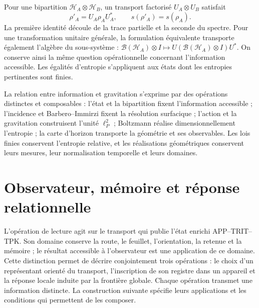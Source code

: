 Pour une bipartition \(\mathcal H_A\otimes\mathcal H_B\), un
transport factorisé \(U_A\otimes U_B\) satisfait
\[
 \rho'_A=U_A\rho_AU_A^*,\qquad s(\rho'_A)=s(\rho_A).
\]
La première identité découle de la trace partielle et la seconde du spectre.
Pour une transformation unitaire générale, la formulation équivalente transporte également
l'algèbre du sous-système :
\(\mathcal B(\mathcal H_A)\otimes I\mapsto
U(\mathcal B(\mathcal H_A)\otimes I)U^*\).
On conserve ainsi la même question opérationnelle concernant l'information
accessible. Les égalités d'entropie s'appliquent aux états dont les entropies
pertinentes sont finies.

La relation entre information et gravitation s'exprime par des
opérations distinctes et composables : l'état et la bipartition fixent
l'information accessible ; l'incidence et Barbero--Immirzi fixent la résolution
surfacique ; l'action et la gravitation construisent l'unité \(\ell_P^2\) ;
Boltzmann réalise dimensionnellement l'entropie ; la carte d'horizon
transporte la géométrie et ses observables. Les lois finies conservent
l'entropie relative, et les réalisations géométriques conservent leurs mesures,
leur normalisation temporelle et leurs domaines.




\chapter{Observateur, mémoire et réponse relationnelle}
\label{x_reciprocidad:vii:sec:observador-respuesta}

L'opération de lecture agit sur le transport qui publie l'état
enrichi APP--TRIT--TPK. Son domaine conserve la route, le feuillet, l'orientation,
la retenue et la mémoire ; le résultat accessible à l'observateur est une application
de ce domaine. Cette distinction permet de décrire conjointement trois
opérations : le choix d'un représentant orienté du transport,
l'inscription de son registre dans un appareil et la réponse locale induite
par la frontière globale. Chaque opération transmet une information distincte.
La construction suivante spécifie leurs applications et les conditions qui
permettent de les composer.

